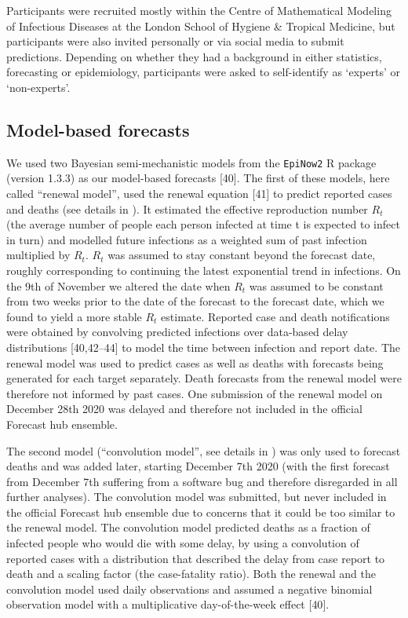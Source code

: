 \documentclass[10pt,letterpaper]{article}
\begin{document}
Participants were recruited mostly within the Centre of Mathematical
Modeling of Infectious Diseases at the London School of Hygiene \&
Tropical Medicine, but participants were also invited personally or via
social media to submit predictions. Depending on whether they had a
background in either statistics, forecasting or epidemiology,
participants were asked to self-identify as `experts' or `non-experts'.

\hypertarget{model-based-forecasts}{%
\subsection{Model-based forecasts}\label{model-based-forecasts}}

We used two Bayesian semi-mechanistic models from the \texttt{EpiNow2} R
package (version 1.3.3) as our model-based forecasts {[}40{]}. The first
of these models, here called ``renewal model'', used the renewal
equation {[}41{]} to predict reported cases and deaths (see details in
). It estimated the effective reproduction
number \(R_t\) (the average number of people each person infected at
time t is expected to infect in turn) and modelled future infections as
a weighted sum of past infection multiplied by \(R_t\). \(R_t\) was
assumed to stay constant beyond the forecast date, roughly corresponding
to continuing the latest exponential trend in infections. On the 9th of
November we altered the date when \(R_t\) was assumed to be constant
from two weeks prior to the date of the forecast to the forecast date,
which we found to yield a more stable \(R_t\) estimate. Reported case
and death notifications were obtained by convolving predicted infections
over data-based delay distributions {[}40,42--44{]} to model the time
between infection and report date. The renewal model was used to predict
cases as well as deaths with forecasts being generated for each target
separately. Death forecasts from the renewal model were therefore not
informed by past cases. One submission of the renewal model on December
28th 2020 was delayed and therefore not included in the official
Forecast hub ensemble.

The second model (``convolution model'', see details in
) was only used to forecast deaths and was
added later, starting December 7th 2020 (with the first forecast from
December 7th suffering from a software bug and therefore disregarded in
all further analyses). The convolution model was submitted, but never
included in the official Forecast hub ensemble due to concerns that it
could be too similar to the renewal model. The convolution model
predicted deaths as a fraction of infected people who would die with
some delay, by using a convolution of reported cases with a distribution
that described the delay from case report to death and a scaling factor
(the case-fatality ratio). Both the renewal and the convolution model
used daily observations and assumed a negative binomial observation
model with a multiplicative day-of-the-week effect {[}40{]}.
\end{document}
